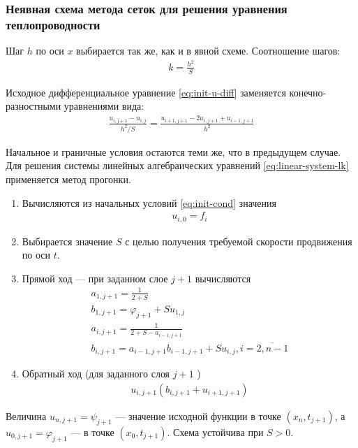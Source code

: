 \subsubsection{Неявная схема метода сеток для решения уравнения теплопроводности}
Шаг \(h\) по оси \(x\) выбирается так же, как и в явной схеме. Соотношение шагов:
\begin{align}
	k = \frac{h^2}{S}
\end{align}

Исходное дифференциальное уравнение \cref{eq:init-u-diff} заменяется конечно-разностными уравнениями вида:
\begin{align}\label{eq:linear-system-lk}
	\frac{u_{i,j+1} - u_{i,j}}{h^2/S} = \frac{u_{i+1,j+1} - 2u_{i,j+1} + u_{i-1,j+1}}{h^2}
\end{align}

Начальное и граничные условия остаются теми же, что в предыдущем случае. Для решения системы линейных алгебраических уравнений \cref{eq:linear-system-lk} применяется метод прогонки.

\begin{enumerate}
	\item Вычисляются из начальных условий \cref{eq:init-cond} значения
	      \begin{align}
		      u_{i,0} = f_i
	      \end{align}
	\item Выбирается значение \(S\) с целью получения требуемой скорости продвижения по оси \(t\).
	\item Прямой ход --- при заданном слое \(j+1\) вычисляются
	      \begin{align}
		      a_{1,j+1} = \frac{1}{2+S}              \\
		      b_{1,j+1} = \varphi_{j+1} + S u_{1, j} \\
		      a_{i,j+1} = \frac{1}{2+S-a_{i-1,j+1}}  \\
		      b_{i,j+1} = a_{i-1,j+1}b_{i-1,j+1}+S u_{i,j}, i = \overline{2, n-1}
	      \end{align}
	\item Обратный ход (для заданного слоя \(j+1\) )
	      \begin{align}
		      u_{i,j+1}(b_{i,j+1}+u_{i+1,j+1})
	      \end{align}
\end{enumerate}

Величина \(u_{n,j+1} = \psi_{j+1}\) --- значение исходной функции в точке \((x_n, t_{j+1})\), а \(u_{0,j+1} = \varphi_{j+1}\) --- в точке \((x_0, t_{j+1})\). Схема устойчива при \(S > 0\).

